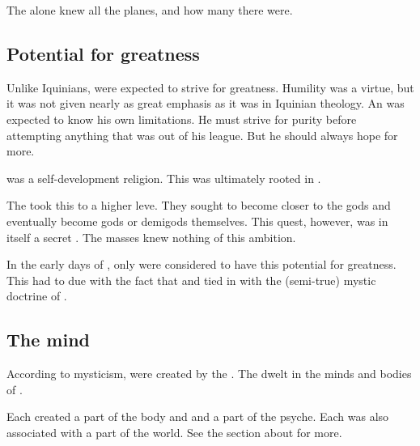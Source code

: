 The \Primordials alone knew all the planes, and how many there were. 









\subsection{Potential for greatness}
Unlike Iquinians, \Ortaicans were expected to strive for greatness. 
Humility was a virtue, but it was not given nearly as great emphasis as it was in Iquinian theology. 
An \Ortaican was expected to know his own limitations.
He must strive for purity before attempting anything that was out of his league.
But he should always hope for more. 

\Ortaicanism was a self-development religion. 
This was ultimately rooted in .

The \rethyaxes took this to a higher leve. 
They sought to become closer to the gods and eventually become gods or demigods themselves.
This quest, however, was in itself a secret \arcanum.
The masses knew nothing of this ambition.

In the early days of \Ortaica, only \scathae were considered to have this potential for greatness. 
This had to due with the fact that  and tied in with the (semi-true) mystic doctrine of . 









\subsection[The Scathaese mind]{The \scathaese mind}
According to \rethyax mysticism, \scathae were created by the .
The {\Primordials dwelt in the minds and bodies of \scathae}. 

Each \Primordial created a part of the body and and a part of the \scathaese psyche. 
Each was also associated with a part of the world. 
See the section about  for more. 

